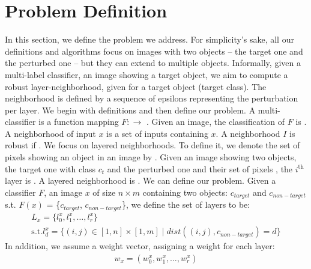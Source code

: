 
\section{Problem Definition}
In this section, we define the problem we address.
For simplicity's sake, all our definitions and algorithms focus on images with two objects -- the target one and the perturbed one -- but they can extend to multiple objects.
Informally, given a multi-label classifier, an image showing a target object, we aim to compute 
a robust layer-neighborhood, given for a target object (target class). The neighborhood is defined by
a sequence of epsilons representing the perturbation per layer.
We begin with definitions and then define our problem.
A multi-classifier is a function mapping  $F:\rightarrow$ .
Given an image, the classification of $F$ is .
A neighborhood of input $x$ is a set of inputs containing $x$. A neighborhood $I$ is robust if . We focus on layered neighborhoods. 
To define it, we denote the set of pixels showing an object in an image by .
Given an image showing two objects, the target one with class $c_t$ and the perturbed one and their set of pixels , the $i^\text{th}$ layer is .
A layered neighborhood is .
We can define our problem.
Given a classifier $F$, an image $x$ of size $n\times m$ containing two objects: $c_{target}$ and $c_{non-target}$ \textrm{s.t.} $F(x)$ = \{$c_{target}$, $c_{non-target}$\}, 
we define the set of layers to be:
\begin{gather*}
    L_x = \{l_0^x, l_1^x, \ldots, l_r^x\}\\
    \textrm{s.t.}  l_d^x = \{(i,j) \in [1,n]\times [1,m] \mid dist((i, j), c_{non-target}) = d\}
\end{gather*}
In addition, we assume a weight vector, assigning a weight for each layer:
\begin{gather*}
    w_x = (w_0^x, w_1^x, \ldots, w_r^x)\\
\end{gather*}
